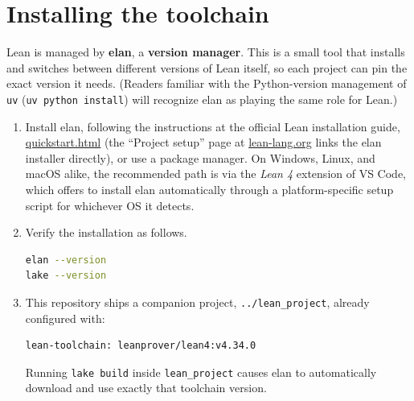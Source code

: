 \section{Installing the toolchain}\label{sec:00-setup:02-installing-toolchain:1}

Lean is managed by \textbf{elan}, a \textbf{version manager}. This is a small tool that installs and switches between different versions of Lean itself, so each project can pin the exact version it needs. (Readers familiar with the Python-version management of \texttt{uv} (\texttt{uv python install}) will recognize elan as playing the same role for Lean.)

\begin{enumerate}
\def\labelenumi{\arabic{enumi}.}
\item
  Install elan, following the instructions at the official Lean installation guide, \href{https://lean-lang.org/lean4/doc/quickstart.html}{quickstart.html} (the ``Project setup'' page at \href{https://lean-lang.org/}{lean-lang.org} links the elan installer directly), or use a package manager. On Windows, Linux, and macOS alike, the recommended path is via the \emph{Lean 4} extension of VS Code, which offers to install elan automatically through a platform-specific setup script for whichever OS it detects.
\item
  Verify the installation as follows.

\begin{lstlisting}[language=sh]
elan --version
lake --version
\end{lstlisting}
\item
  This repository ships a companion project, \texttt{../\allowbreak{}lean\_\allowbreak{}project}, already configured with:

\begin{lstlisting}
lean-toolchain: leanprover/lean4:v4.34.0
\end{lstlisting}

  Running \texttt{lake build} inside \texttt{lean\_\allowbreak{}project} causes elan to automatically download and use exactly that toolchain version.
\end{enumerate}
